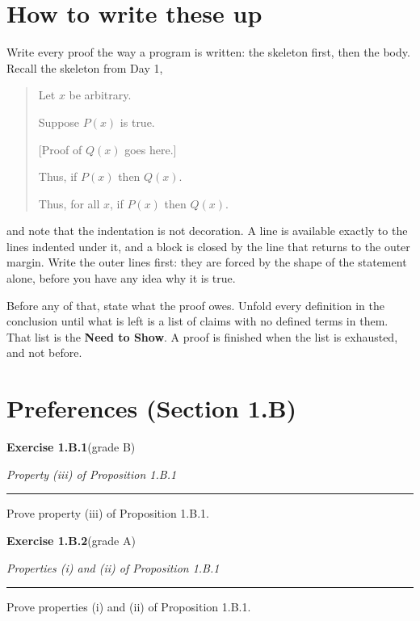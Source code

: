 \documentclass[12pt]{article}
\newcommand{\exercise}[3]{%
  \par\penalty-250\bigskip
  \noindent\textbf{\large Exercise #1}\quad\textnormal{(grade #2)}%
  \par\nobreak\smallskip
  \noindent\textit{#3}%
  \par\nobreak\smallskip
  \noindent\rule{\linewidth}{0.4pt}%
  \par\nobreak\smallskip}
\newenvironment{statement}{\par\medskip}{\par\medskip}
\begin{document}
\section*{How to write these up}

Write every proof the way a program is written: the skeleton first, then the
body. Recall the skeleton from Day 1,
\begin{quote}
Let $x$ be arbitrary.\par
\hspace*{2.25em}Suppose $P(x)$ is true.\par
\hspace*{4.5em}[Proof of $Q(x)$ goes here.]\par
\hspace*{2.25em}Thus, if $P(x)$ then $Q(x)$.\par
Thus, for all $x$, if $P(x)$ then $Q(x)$.
\end{quote}
and note that the indentation is not decoration. A line is available exactly to
the lines indented under it, and a block is closed by the line that returns to
the outer margin. Write the outer lines first: they are forced by the shape of
the statement alone, before you have any idea why it is true.

Before any of that, state what the proof owes. Unfold every definition in the
conclusion until what is left is a list of claims with no defined terms in
them. That list is the \textbf{Need to Show}. A proof is finished when the list
is exhausted, and not before.

\newpage
\section*{Preferences (Section 1.B)}

\exercise{1.B.1}{B}{Property (iii) of Proposition 1.B.1}

\begin{statement}
Prove property (iii) of Proposition 1.B.1.
\end{statement}


\exercise{1.B.2}{A}{Properties (i) and (ii) of Proposition 1.B.1}

\begin{statement}
Prove properties (i) and (ii) of Proposition 1.B.1.
\end{statement}
\end{document}
